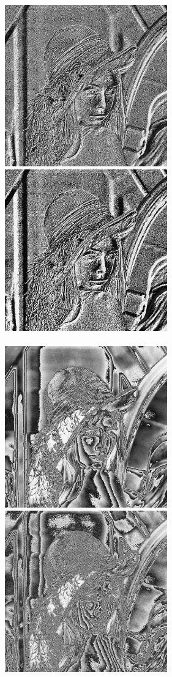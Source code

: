 \documentclass[a4paper,12pt,openany]{report}
\begin{document}
\begin{center}
\\
\includegraphics[width=7cm]{resources/modified/lena/lena_emboss_1.jpg}
\includegraphics[width=7cm]{resources/modified/lena/lena_emboss_2.jpg}
\\
\\
\includegraphics[width=7cm]{resources/modified/lena/lena_ridge_detection_1.jpg}
\includegraphics[width=7cm]{resources/modified/lena/lena_ridge_detection_2.jpg}
\end{center}
\end{document}

